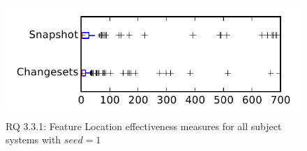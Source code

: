 
\begin{figure}
\centering
\includegraphics[height=0.4\textheight]{figures/flt_seed/rq1_tiny_1}
\caption{RQ 3.3.1: Feature Location effectiveness measures for all subject systems with $seed=1$}
\label{fig:flt_seed:rq1:tiny}
\end{figure}

